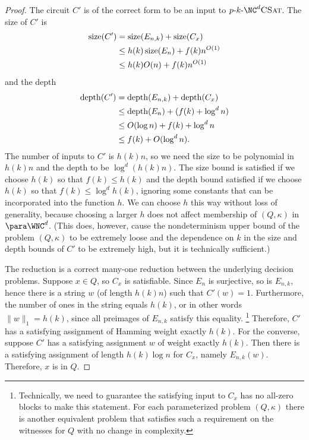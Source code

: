 \begin{proof}
  The circuit $C'$ is of the correct form to be an input to $\pNCSAT$.
  The size of $C'$ is
  \begin{align*}
    \operatorname{size}(C') & = \operatorname{size}(E_{n, k}) + \operatorname{size}(C_x) \\
    & \leq h(k) \operatorname{size}(E_n) + f(k) n^{O(1)} \\
    & \leq h(k) O(n) + f(k) n^{O(1)}
  \end{align*}
  and the depth
  \begin{align*}
    \operatorname{depth}(C') & = \operatorname{depth}(E_{n, k}) + \operatorname{depth}(C_x) \\
    & \leq \operatorname{depth}(E_n) + (f(k) + \log^d n) \\
    & \leq O(\log n) + f(k) + \log^d n \\
    & \leq f(k) + O(\log^d n).
  \end{align*}
  The number of inputs to $C'$ is $h(k) n$, so we need the size to be polynomial in $h(k) n$ and the depth to be $\log^d (h(k) n)$.
  The size bound is satisfied if we choose $h(k)$ so that $f(k) \leq h(k)$ and the depth bound satisfied if we choose $h(k)$ so that $f(k) \leq \log^d h(k)$, ignoring some constants that can be incorporated into the function $h$.
  We can choose $h$ this way without loss of generality, because choosing a larger $h$ does not affect membership of $(Q, \kappa)$ in $\para \WNC^d$.
  (This does, however, cause the nondeterminism upper bound of the problem $(Q, \kappa)$ to be extremely loose and the dependence on $k$ in the size and depth bounds of $C'$ to be extremely high, but it is technically sufficient.)

  The reduction is a correct many-one reduction between the underlying decision problems.
  Suppose $x \in Q$, so $C_x$ is satisfiable.
  Since $E_n$ is surjective, so is $E_{n, k}$, hence there is a string $w$ (of length $h(k) n$) such that $C'(w) = 1$.
  Furthermore, the number of ones in the string equals $h(k)$, or in other words $\|w\|_1 = h(k)$, since all preimages of $E_{n, k}$ satisfy this equality.%
  \footnote{%
    Technically, we need to guarantee the satisfying input to $C_x$ has no all-zero blocks to make this statement.
    For each parameterized problem $(Q, \kappa)$ there is another equivalent problem that satisfies such a requirement on the witnesses for $Q$ with no change in complexity.%
  }
  Therefore, $C'$ has a satisfying assignment of Hamming weight exactly $h(k)$.
  For the converse, suppose $C'$ has a satisfying assignment $w$ of weight exactly $h(k)$.
  Then there is a satisfying assignment of length $h(k) \log n$ for $C_x$, namely $E_{n, k}(w)$.
  Therefore, $x$ is in $Q$.


\end{proof}
